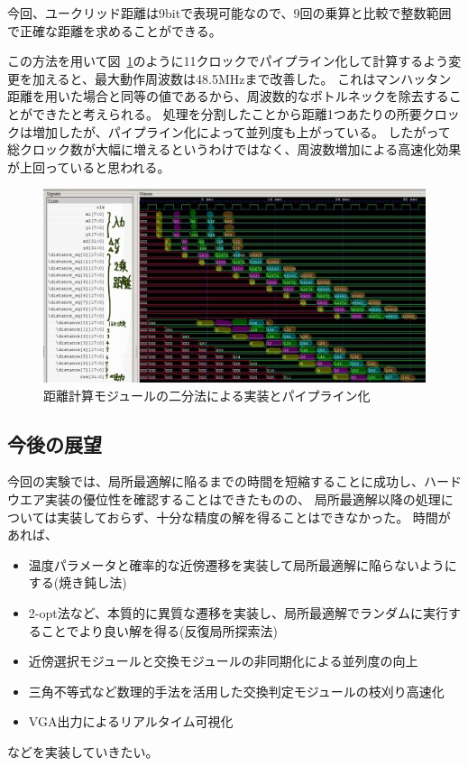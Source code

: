 今回、ユークリッド距離は9bitで表現可能なので、9回の乗算と比較で整数範囲で正確な距離を求めることができる。

この方法を用いて図~\ref{fig:distance_binary}のように11クロックでパイプライン化して計算するよう変更を加えると、最大動作周波数は48.5MHzまで改善した。
これはマンハッタン距離を用いた場合と同等の値であるから、周波数的なボトルネックを除去することができたと考えられる。
処理を分割したことから距離1つあたりの所要クロックは増加したが、パイプライン化によって並列度も上がっている。
したがって総クロック数が大幅に増えるというわけではなく、周波数増加による高速化効果が上回っていると思われる。

\begin{figure}
    \begin{center}
        \includegraphics[width=15cm]{figure/distance_binary.jpg}
        \caption{距離計算モジュールの二分法による実装とパイプライン化}\label{fig:distance_binary}
    \end{center}
\end{figure}

\subsection{今後の展望}
今回の実験では、局所最適解に陥るまでの時間を短縮することに成功し、ハードウエア実装の優位性を確認することはできたものの、
局所最適解以降の処理については実装しておらず、十分な精度の解を得ることはできなかった。
時間があれば、
\begin{itemize}
    \item 温度パラメータと確率的な近傍遷移を実装して局所最適解に陥らないようにする(焼き鈍し法)
    \item 2-opt法など、本質的に異質な遷移を実装し、局所最適解でランダムに実行することでより良い解を得る(反復局所探索法)
    \item 近傍選択モジュールと交換モジュールの非同期化による並列度の向上
    \item 三角不等式など数理的手法を活用した交換判定モジュールの枝刈り高速化
    \item VGA出力によるリアルタイム可視化
\end{itemize}
などを実装していきたい。